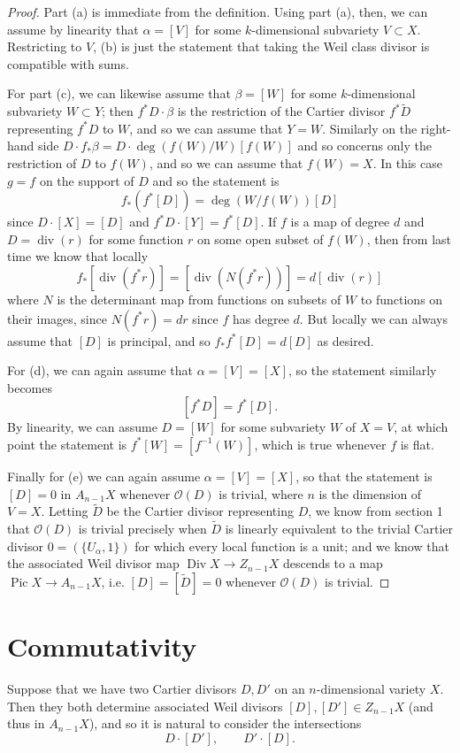 \documentclass[leqno, openany]{memoir}
\theoremstyle{definition}
\theoremstyle{remark}
\theoremstyle{plain}
\theoremstyle{definition}
\theoremstyle{remark}
\newcommand{\mc}[1]{\mathcal{#1}}
\renewcommand{\div}{\operatorname{div}}
\DeclareMathOperator{\Pic}{Pic}
\DeclareMathOperator{\Div}{Div}
\begin{document}
\begin{proof}
Part (a) is immediate from the definition. Using part (a), then, we can assume by linearity that $\alpha = [V]$ for some $k$-dimensional subvariety $V \subset X$. Restricting to $V$, (b) is just the statement that taking the Weil class divisor is compatible with sums.

For part (c), we can likewise assume that $\beta = [W]$ for some $k$-dimensional subvariety $W \subset Y$; then $f^* D \cdot \beta$ is the restriction of the Cartier divisor $f^* \tilde D$ representing $f^* D$ to $W$, and so we can assume that $Y = W$. Similarly on the right-hand side $D \cdot f_* \beta = D \cdot \deg(f(W)/W) [f(W)]$ and so concerns only the restriction of $D$ to $f(W)$, and so we can assume that $f(W) = X$. In this case $g = f$ on the support of $D$ and so the statement is \[ f_* (f^* [D]) = \deg(W/f(W)) [D] \] since $D \cdot [X] = [D]$ and $f^* D \cdot [Y] = f^* [D]$. If $f$ is a map of degree $d$ and $D = \div(r)$ for some function $r$ on some open subset of $f(W)$, then from last time we know that locally \[ f_* [\div(f^* r)] = [\div(N(f^* r))] = d [\div(r)] \] where $N$ is the determinant map from functions on subsets of $W$ to functions on their images, since $N(f^* r) = dr$ since $f$ has degree $d$. But locally we can always assume that $[D]$ is principal, and so $f_* f^* [D] = d [D]$ as desired.

For (d), we can again assume that $\alpha = [V] = [X]$, so the statement similarly becomes \[ [f^* D] = f^* [D] . \] By linearity, we can assume $D = [W]$ for some subvariety $W$ of $X = V$, at which point the statement is $f^* [W] = [f^{-1}(W)]$, which is true whenever $f$ is flat.

Finally for (e) we can again assume $\alpha = [V] = [X]$, so that the statement is $[D] = 0$ in $A_{n-1} X$ whenever $\mc{O}(D)$ is trivial, where $n$ is the dimension of $V = X$. Letting $\tilde D$ be the Cartier divisor representing $D$, we know from section 1 that $\mc{O}(D)$ is trivial precisely when $\tilde D$ is linearly equivalent to the trivial Cartier divisor $0 = (\{U_\alpha, 1\})$ for which every local function is a unit; and we know that the associated Weil divisor map $\Div X \to Z_{n-1} X$ descends to a map $\Pic X \to A_{n-1} X$, i.e. $[D] = [\tilde D] = 0$ whenever $\mc{O}(D)$ is trivial.
\end{proof}

\section{Commutativity}
Suppose that we have two Cartier divisors $D, D'$ on an $n$-dimensional variety $X$. Then they both determine associated Weil divisors $[D], [D'] \in Z_{n-1} X$ (and thus in $A_{n-1} X$), and so it is natural to consider the intersections \[ D \cdot [D'], \qquad D' \cdot [D] . \]
\end{document}
